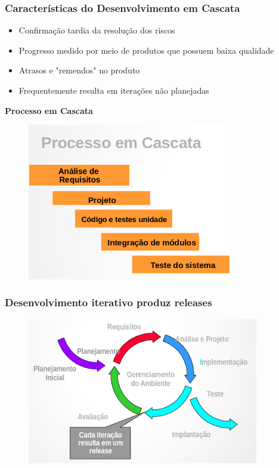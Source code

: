 \begin{frame}
 \frametitle{Características do Desenvolvimento em Cascata}
 \begin{minipage}[t]{0.48\linewidth}
  \begin{itemize}
   \item Confirmação tardia da resolução dos riscos
    \item Progresso medido por meio de produtos que possuem baixa qualidade
    \item Atrasos e "remendos" no produto
    \item Frequentemente resulta em iterações não planejadas
  \end{itemize}
 \end{minipage}
\begin{minipage}[t]{0.48\linewidth}
\textbf{Processo em Cascata}
  \begin{figure}
   \centering
   \includegraphics[width = 0.8\textwidth]{figs/fig7.png}
  \end{figure}
\end{minipage}
\end{frame}


\begin{frame}
 \frametitle{Desenvolvimento iterativo produz releases}
  \begin{figure}
   \centering
   \includegraphics[width = 0.9\textwidth]{figs/fig8.png}
  \end{figure}
\end{frame}

